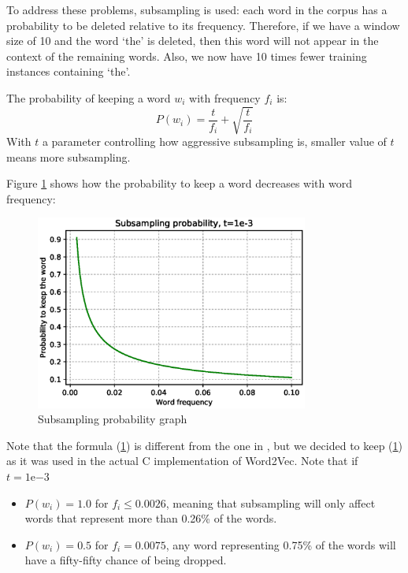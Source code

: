 To address these problems, subsampling is used: each word in the corpus has a probability to be deleted relative to its frequency. Therefore, if we have a window size of 10 and the word `the' is deleted, then this word will not appear in the context of the remaining words. Also, we now have 10 times fewer training instances containing `the'.

The probability of keeping a word $w_i$ with frequency $f_i$ is:
\begin{equation}
    P(w_i) = \frac{t}{f_i} + \sqrt{\frac{t}{f_i}}
    \label{subsampling}
\end{equation}
With $t$ a parameter controlling how aggressive subsampling is, smaller value of $t$ means more subsampling. 

\newpage
Figure \ref{subsampling} shows how the probability to keep a word decreases with word frequency:
\begin{figure}[H]
    \centering
    \includegraphics[width=0.8\textwidth]{Images/subsampling_prob.eps}
    \caption{Subsampling probability graph}
    \label{subsampling}
\end{figure}

Note that the formula (\ref{subsampling}) is different from the one in \cite{word2vec2}, but we decided to keep (\ref{subsampling}) as it was used in the actual C implementation of Word2Vec. Note that if $t=1\mathrm{e}{-3}$
\begin{itemize}
    \item $P(w_i) = 1.0$ for $f_i\leq0.0026$, meaning that subsampling will only affect words that represent more than 0.26\% of the words.
    \item $P(w_i) = 0.5$ for $f_i=0.0075$, any word representing 0.75\% of the words will have a fifty-fifty chance of being dropped.
\end{itemize}

